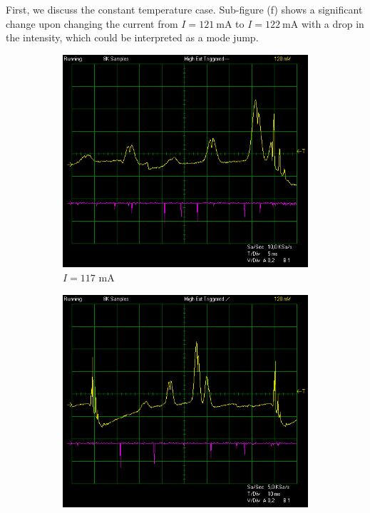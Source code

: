 \documentclass{article}
\begin{document}
First, we discuss the constant temperature case. Sub-figure (f) shows a significant change upon changing the current from $I = \SI{121}{\mA}$ to $I = \SI{122}{\mA}$ with a drop in the intensity, which could be interpreted as a mode jump. 

\begin{figure}[h]
    \centering
    \begin{subfigure}[b]{0.3\textwidth}
        \includegraphics[width=\textwidth]{Figures/2/Tconst20C/117mA.jpg}
        \caption{$I=117$ mA}
        \label{fig:117mA}
    \end{subfigure}
    \begin{subfigure}[b]{0.3\textwidth}
        \includegraphics[width=\textwidth]{Figures/2/Tconst20C/118mA.jpg}

\end{subfigure}
\end{figure}
\end{document}
